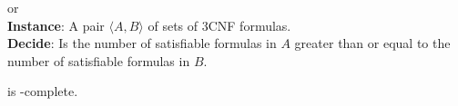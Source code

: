 \begin{problem}{\csat or } \citep{compsat}\\
    \tab \textbf{Instance}: A pair $\langle A,B \rangle$
of sets of 3CNF formulas.\\
    \tab \textbf{Decide}: Is the number of satisfiable formulas in $A$
    greater than or equal to the number of satisfiable formulas in $B$.
\end{problem}


\begin{theorem}\label{thm:csat} \citep{compsat}
    \csat is \tp-complete.
\end{theorem}



